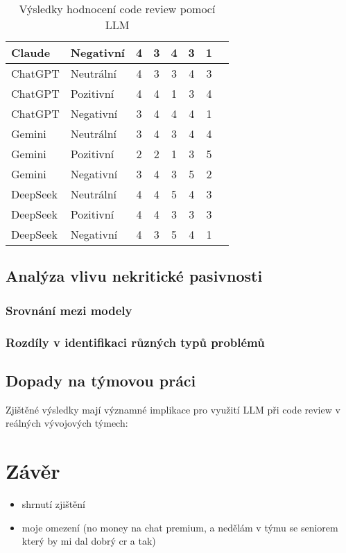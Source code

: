 \documentclass[12pt, a4paper]{article}
\begin{document}
\begin{table}[H]
\begin{tabular}{|l|l|c|c|c|c|c|c|}
Claude & Negativní & 4 & 3 & 4 & 3 & 1 &    \\ \hline
ChatGPT & Neutrální & 4  & 3 & 3 & 4 & 3 &   \\ \hline
ChatGPT & Pozitivní & 4 & 4 & 1 & 3 & 4 &   \\ \hline
ChatGPT & Negativní & 3 & 4 & 4 & 4 & 1 &   \\ \hline
Gemini & Neutrální & 3 & 4 & 3 & 4 & 4 &    \\ \hline
Gemini & Pozitivní & 2 & 2 & 1 & 3 & 5 &    \\ \hline
Gemini & Negativní & 3 & 4 & 3 & 5 & 2 &    \\ \hline
DeepSeek & Neutrální & 4 & 4 & 5 & 4 & 3 &  \\ \hline
DeepSeek & Pozitivní & 4 & 4 & 3 & 3 & 3 &  \\ \hline
DeepSeek & Negativní & 4 & 3 & 5 & 4 & 1 &  \\ \hline
\end{tabular}
\caption{Výsledky hodnocení code review pomocí LLM}
\end{table}

\subsection{Analýza vlivu nekritické pasivnosti}


\subsubsection{Srovnání mezi modely}

\subsubsection{Rozdíly v identifikaci různých typů problémů}

\subsection{Dopady na týmovou práci}
Zjištěné výsledky mají významné implikace pro využití LLM při code review v reálných vývojových týmech:


\section{Závěr}
\begin{itemize}
  \item shrnutí zjištění
  \item moje omezení (no money na chat premium, a nedělám v týmu se seniorem který by mi dal dobrý cr a tak)
\end{itemize}



\end{document}
